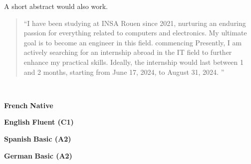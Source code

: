 \documentclass[10pt,a4paper,ragged2e,withhyper]{./AltaCV/altacv}
\begin{document}
\begin{paracol}{2}
  \divider

  A short abstract would also work.

  \medskip

  \switchcolumn


  \begin{quote}
    ``I have been studying at INSA Rouen since 2021, nurturing an enduring passion for everything related to computers and electronics.
    My ultimate goal is to become an engineer in this field.
    commencing
    Presently, I am actively searching for an internship abroad in the IT field to further enhance my practical skills. Ideally, the internship would last between 1 and 2 months, starting from June 17, 2024, to August 31, 2024.
    ''
  \end{quote}



  \divider


  \divider



  \\

  \divider

  \cvtag{\LaTeX}


  \textcolor{emphasis}{\textbf{French}} \hfill \textbf{Native}\\

  \divider

  \textcolor{emphasis}{\textbf{English}} \hfill \textbf{Fluent (C1)}\\

  \divider

  \textcolor{emphasis}{\textbf{Spanish}} \hfill \textbf{Basic (A2)}\\

  \divider

  \textcolor{emphasis}{\textbf{German}} \hfill \textbf{Basic (A2)}\\

\end{paracol}
\end{document}
